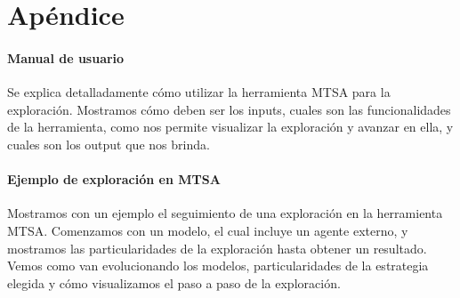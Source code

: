 \chapter{Apéndice}

\subsubsection{Manual de usuario}

Se explica detalladamente cómo utilizar la herramienta MTSA para la exploración. 
Mostramos cómo deben ser los inputs, cuales son las funcionalidades de la herramienta, como nos permite visualizar 
la exploración y avanzar en ella, y cuales son los output que nos brinda.

\subsubsection{Ejemplo de exploración en MTSA}

Mostramos con un ejemplo el seguimiento de una exploración en la herramienta MTSA. 
Comenzamos con un modelo, el cual incluye un agente externo, y mostramos las particularidades de la exploración hasta obtener un resultado. 
Vemos como van evolucionando los modelos, particularidades de la estrategia elegida y cómo visualizamos el paso a paso de la exploración.

